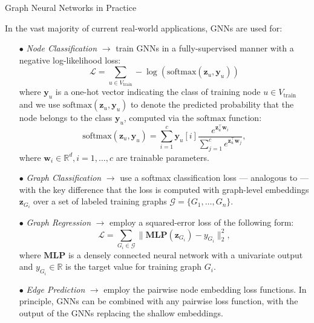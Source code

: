 \documentclass[10pt, aspectratio=169, compress, protectframetitle, handout]{beamer}
\begin{document}
\begin{frame}[allowframebreaks]{Graph Neural Networks in Practice}

    In the vast majority of current real-world applications, GNNs are used for:
    \begin{itemize}
        \item[\alert{$\bullet$}] \emph{Node Classification} $\rightarrow$ train GNNs in a fully-supervised manner with a negative log-likelihood loss:
        \begin{equation}
            \mathcal L = \sum_{u \in V_\text{train}} -\log(\text{softmax}(\mathbf z_u, \mathbf y_u))
            \label{eq:lossnodeclass}
        \end{equation}
        where $\mathbf y_u$ is a one-hot vector indicating the class of training node $u \in V_\text{train}$ and we use $\text{softmax}(\mathbf z_u, \mathbf y_u)$ to denote the predicted probability that the node belongs to the class $\mathbf y_u$, computed via the $\text{softmax}$ function:
        \begin{equation}
            \text{softmax}(\mathbf z_u, \mathbf y_u) = \sum^c_{i=1} \mathbf y_u[i] \frac{e^{\mathbf z_u^\top \mathbf w_i}}{\sum^c_{j=1} e^{\mathbf z_u^\top \mathbf w_j}},
        \end{equation}
        where $\mathbf w_i \in \mathbb R^d, i = 1, \ldots, c$ are trainable parameters.
        
        \item[\alert{$\bullet$}] \emph{Graph Classification} $\rightarrow$ use a softmax classification loss --- analogous to  --- with the key difference that the loss is computed with graph-level embeddings $\mathbf z_{G_i}$ over a set of labeled training graphs $\mathcal G = \{G_1, \ldots, G_n\}$.
        
        \item[\alert{$\bullet$}] \emph{Graph Regression} $\rightarrow$ employ a squared-error loss of the following form:
        \begin{equation}
            \mathcal L = \sum_{G_i \in \mathcal G} \| \textbf{MLP}(\mathbf z_{G_i}) - y_{G_i}\|_2^2,
        \end{equation}
        where $\textbf{MLP}$ is a densely connected neural network with a univariate output and $y_{G_i} \in \mathbb R$ is the target value for training graph $G_i$.
        
        \item[\alert{$\bullet$}] \emph{Edge Prediction} $\rightarrow$ employ the pairwise node embedding loss functions. In principle, GNNs can be combined with any pairwise loss function, with the output of the GNNs replacing the shallow embeddings.
    \end{itemize}
\end{frame}
\end{document}
